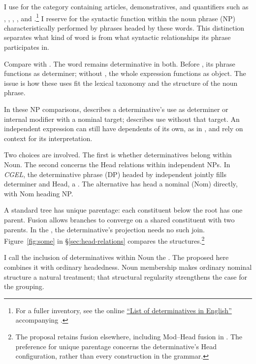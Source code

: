 \documentclass[12pt]{article}
\begin{document}
I use  for the category containing articles, demonstratives, and quantifiers such as , , , , and .\footnote{For a fuller inventory, see the online \href{https://www.cambridge.org/highereducation/api/resources/2AC8DF5CA558F8A6FCDFACD0EAF8EA08}{\enquote{List of determinatives in English}} accompanying \textcite{Huddleston2021}.} I reserve  for the syntactic function within the noun phrase (NP) characteristically performed by phrases headed by these words. This distinction separates what kind of word  is from what syntactic relationships its phrase participates in.

Compare  with . The word  remains determinative in both. Before , its phrase functions as determiner; without , the whole expression functions as object. The issue is how these uses fit the lexical taxonomy and the structure of the noun phrase.

In these NP comparisons,  describes a determinative's use as determiner or internal modifier with a nominal target;  describes use without that target. An independent expression can still have dependents of its own, as in , and rely on context for its interpretation.

Two choices are involved. The first is whether determinatives belong within Noun. The second concerns the Head relations within independent NPs. In \textit{CGEL}, the determinative phrase (DP) headed by independent  jointly fills determiner and Head, a  \citep[410--412]{huddleston2002}. The alternative has  head a nominal (Nom) directly, with Nom heading NP.

A standard tree has unique parentage: each constituent below the root has one parent. Fusion allows branches to converge on a shared constituent with two parents. In the , the determinative's projection needs no such join. Figure~\ref{fig:some} in §\ref{sec:head-relations} compares the structures.\footnote{The proposal retains fusion elsewhere, including Mod--Head fusion in . The preference for unique parentage concerns the determinative's Head configuration, rather than every construction in the grammar.}

I call the inclusion of determinatives within Noun the . The  proposed here combines it with ordinary headedness. Noun membership makes ordinary nominal structure a natural treatment; that structural regularity strengthens the case for the grouping.
\end{document}
